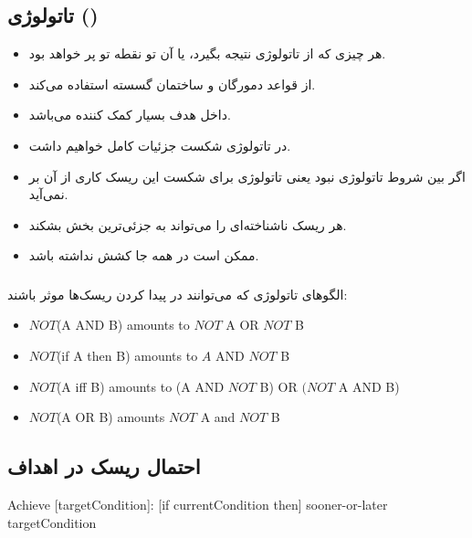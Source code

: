 \subsection{تاتولوژی ()}

\begin{itemize}
    \item هر چیزی که از تاتولوژی نتیجه بگیرد،  یا  آن تو نقطه تو
    پر خواهد بود.
    \item از قواعد دمورگان و ساختمان گسسته استفاده می‌کند.
    \item داخل هدف بسیار کمک کننده می‌باشد.
    \item در تاتولوژی شکست جزئیات کامل خواهیم داشت.
    \item اگر بین شروط تاتولوژی نبود یعنی تاتولوژی برای شکست این ریسک کاری از آن
    بر نمی‌آید.
    \item هر ریسک ناشناخته‌ای را می‌تواند به جزئی‌ترین بخش بشکند.
    \item ممکن است در همه جا کشش نداشته باشد.
\end{itemize}

\subsubsection{}

الگو‌های تاتولوژی که می‌توانند در پیدا کردن ریسک‌ها موثر باشند:

\begin{LTR}
    \begin{itemize}
        \item $NOT$(A AND B) amounts to $NOT$ A OR $NOT$ B
        \item $NOT$(if A then B) amounts to $A$ AND $NOT$ B
        \item $NOT$(A iff B) amounts to (A AND $NOT$ B) OR $(NOT$ A AND B)
        \item $NOT$(A OR B) amounts $NOT$ A and $NOT$ B
    \end{itemize}
\end{LTR}

\subsection{احتمال ریسک در اهداف }

\begin{LTR}
    Achieve [targetCondition]: [if currentCondition then] sooner-or-later targetCondition
\end{LTR}

